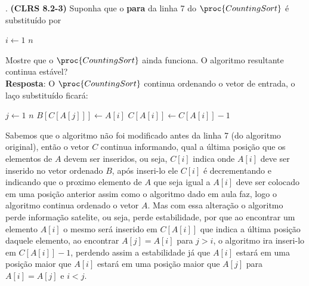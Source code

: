 
. \textbf{(CLRS 8.2-3)} Suponha que o \textbf{para} da linha 7 do $\proc{CountingSort}$ é substituído por 

\begin{codebox}
 \li \For $i \gets 1$ \To $n$ 
\end{codebox}

\noindent Mostre que o $\proc{CountingSort}$ ainda funciona. O algoritmo resultante continua estável?
\\[6pt]
\noindent \textbf{Resposta}: O $\proc{CountingSort}$ continua ordenando o vetor de entrada, o laço substituído ficará:

\begin{codebox}
 \li	\For $j \gets 1$ \To $n$ 
 \li    \Do 
	  $B[C[A[j]]] \gets A[i]$
 \li	  $C[A[i]] \gets C[A[i]] - 1$
	\End
\end{codebox}

Sabemos que o algoritmo não foi modificado antes da linha 7 (do algoritmo original), então o vetor $C$ continua informando, qual a última posição que os elementos de $A$ devem 
ser inseridos, ou seja, $C[i]$ indica onde $A[i]$ deve ser inserido no vetor ordenado $B$, após inseri-lo ele $C[i]$ é decrementando e indicando que o proximo elemento de $A$ que seja igual a $A[i]$ deve ser 
colocado em uma posição anterior assim como o algoritmo dado em aula faz, logo o algoritmo continua ordenado o vetor $A$. Mas com essa alteração o algoritmo
perde informação satelite, ou seja, perde estabilidade, por que ao encontrar um elemento $A[i]$ o mesmo será inserido em $C[A[i]]$ que indica a última posição 
daquele elemento, ao encontrar $A[j] = A[i]$ para $j > i$, o algoritmo ira inseri-lo em $C[A[i]] - 1$, perdendo assim a estabilidade já que $A[i]$ estará 
em uma posição maior que $A[i]$ estará em uma posição maior que $A[j]$ para $A[i] = A[j]$ e $i < j$.
